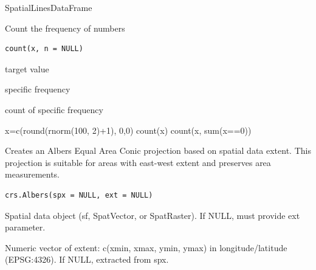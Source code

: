\documentclass[a4paper]{book}
\begin{document}
%
\begin{Value}
SpatialLinesDataFrame
\end{Value}
%
\begin{Description}\relax
Count the frequency of numbers
\end{Description}
%
\begin{Usage}
\begin{verbatim}
count(x, n = NULL)
\end{verbatim}
\end{Usage}
%
\begin{Arguments}
\begin{ldescription}
\item[\code{x}] target value

\item[\code{n}] specific frequency
\end{ldescription}
\end{Arguments}
%
\begin{Value}
count of specific frequency
\end{Value}
%
\begin{Examples}
\begin{ExampleCode}
x=c(round(rnorm(100, 2)+1), 0,0)
count(x)
count(x, sum(x==0))
\end{ExampleCode}
\end{Examples}
%
\begin{Description}\relax
Creates an Albers Equal Area Conic projection based on spatial data extent.
This projection is suitable for areas with east-west extent and preserves
area measurements.
\end{Description}
%
\begin{Usage}
\begin{verbatim}
crs.Albers(spx = NULL, ext = NULL)
\end{verbatim}
\end{Usage}
%
\begin{Arguments}
\begin{ldescription}
\item[\code{spx}] Spatial data object (sf, SpatVector, or SpatRaster). If NULL,
must provide ext parameter.

\item[\code{ext}] Numeric vector of extent: c(xmin, xmax, ymin, ymax) in
longitude/latitude (EPSG:4326). If NULL, extracted from spx.
\end{ldescription}
\end{Arguments}
\end{document}
